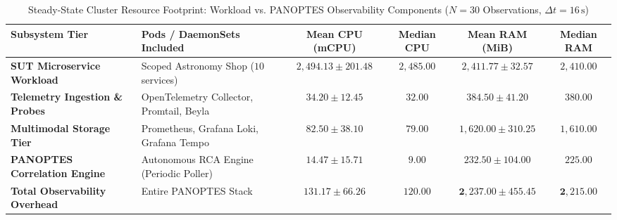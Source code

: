 \begin{table}[!htbp]
\centering
\small
\caption{Steady-State Cluster Resource Footprint: Workload vs. PANOPTES Observability Components ($N=30$ Observations, $\Delta t = 16\,\text{s}$)}
\label{tab:overhead_budget}
\begin{tabularx}{\textwidth}{@{}l p{4.2cm} c c c c@{}}
\toprule
\textbf{Subsystem Tier} & \textbf{Pods / DaemonSets Included} & \textbf{Mean CPU (mCPU)} & \textbf{Median CPU} & \textbf{Mean RAM (MiB)} & \textbf{Median RAM} \\ \midrule
\textbf{SUT Microservice Workload} & Scoped Astronomy Shop ($10$ services) & $2{,}494.13 \pm 201.48$ & $2{,}485.00$ & $2{,}411.77 \pm 32.57$ & $2{,}410.00$ \\ \addlinespace[2pt]
\textbf{Telemetry Ingestion \& Probes} & OpenTelemetry Collector, Promtail, Beyla & $34.20 \pm 12.45$ & $32.00$ & $384.50 \pm 41.20$ & $380.00$ \\ \addlinespace[2pt]
\textbf{Multimodal Storage Tier} & Prometheus, Grafana Loki, Grafana Tempo & $82.50 \pm 38.10$ & $79.00$ & $1{,}620.00 \pm 310.25$ & $1{,}610.00$ \\ \addlinespace[2pt]
\textbf{PANOPTES Correlation Engine} & Autonomous RCA Engine (Periodic Poller) & $14.47 \pm 15.71$ & $9.00$ & $232.50 \pm 104.00$ & $225.00$ \\ \midrule
\textbf{Total Observability Overhead} & Entire PANOPTES Stack & $\mathbf{131.17 \pm 66.26}$ & $\mathbf{120.00}$ & $\mathbf{2{,}237.00 \pm 455.45}$ & $\mathbf{2{,}215.00}$ \\ \bottomrule
\end{tabularx}
\end{table}
